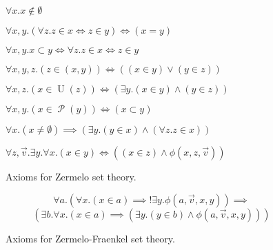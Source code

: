 \begin{figure}
  \begin{axz}\label{axz:empty}
    $\forall x. x \notin \emptyset$
  \end{axz}
  \begin{axz}[extensionality]\label{axz:extensionality}
    $\forall x, y. (\forall z. z \in x \iff z \in y) \iff (x = y)$
  \end{axz}
  \begin{axz}[subset]\label{axz:subset}
    $\forall x, y. x\subset y \iff \forall z. z \in x \iff z \in y$
  \end{axz}
  \begin{axz}[pair]\label{axz:pair}
    $\forall x, y, z. (z \in (x, y)) \iff ((x \in y) \lor (y \in z))$
  \end{axz}
  \begin{axz}[union]\label{axz:union}
    $\forall x, z. (x \in \operatorname{U}(z)) \iff (\exists y. (x \in y) \land (y \in z))$
  \end{axz}
  \begin{axz}[power]\label{axz:power}
    $\forall x, y. (x \in \operatorname{\mathcal{P}}(y)) \iff (x \subset y)$
  \end{axz}
  \begin{axz}[foundation]\label{axz:foundation}
    $\forall x. (x \neq \emptyset) \implies (\exists y. (y \in x) \land (\forall z. z \in x))$
  \end{axz}
  \begin{axz}\label{axz:comprehension}
    $\forall z, \vec{v}. \exists y. \forall x. (x \in y) \iff ((x \in z) \land \phi(x, z, \vec{v}))$
  \end{axz}
  \caption{Axioms for Zermelo set theory.}
  \label{fig:axiomsz}
\end{figure}

\begin{figure}
  \begin{axzf}\label{axzf:replacement}
    $$\forall a. (\forall x. (x \in a) \implies !\exists y. \phi(a, \vec{v}, x, y)) \implies $$
    $$(\exists b. \forall x. (x \in a) \implies (\exists y. (y \in b) \land \phi(a, \vec{v}, x, y)))$$
  \end{axzf}
  \caption{Axioms for Zermelo-Fraenkel set theory.}
  \label{fig:axiomszf}
\end{figure}
